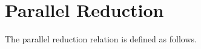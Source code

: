 \begin{fence}
\begin{code}
\AgdaSymbol{;}\AgdaSpace{}%
\AgdaSymbol{;}\AgdaSpace{}%
\AgdaSymbol{;}\AgdaSpace{}%
\AgdaSymbol{;}\<%
\\
%
\>[2]\AgdaSymbol{;}\AgdaSpace{}%
\AgdaSymbol{;}\AgdaSpace{}%
\AgdaSymbol{;}\AgdaSpace{}%
\AgdaSymbol{;}\<%
\\
%
\>[2]\AgdaSymbol{;}\AgdaSpace{}%
\AgdaSymbol{;}\AgdaSpace{}%
\AgdaSymbol{;}\AgdaSpace{}%
\AgdaOperator{\AgdaFunction{\#\AgdaUnderscore{}}}\AgdaSymbol{;}\AgdaSpace{}%
\AgdaOperator{\AgdaInductiveConstructor{\AgdaUnderscore{},\AgdaUnderscore{}}}\AgdaSymbol{;}\AgdaSpace{}%
\AgdaSymbol{;}\AgdaSpace{}%
\AgdaSymbol{;}\AgdaSpace{}%
\AgdaSymbol{;}\AgdaSpace{}%
\AgdaOperator{\AgdaFunction{\AgdaUnderscore{}[\AgdaUnderscore{}]}}\AgdaSymbol{;}\<%
\\
%
\>[2]\AgdaSymbol{;}\AgdaSpace{}%
\AgdaSymbol{;}\AgdaSpace{}%
\AgdaSymbol{;}\AgdaSpace{}%
\AgdaSymbol{;}\AgdaSpace{}%
\AgdaSymbol{;}\AgdaSpace{}%
\AgdaSymbol{;}\AgdaSpace{}%
\AgdaSymbol{)}\<%
\end{code}
\end{fence}

\hypertarget{parallel-reduction}{%
\section{Parallel Reduction}\label{parallel-reduction}}

The parallel reduction relation is defined as follows.


